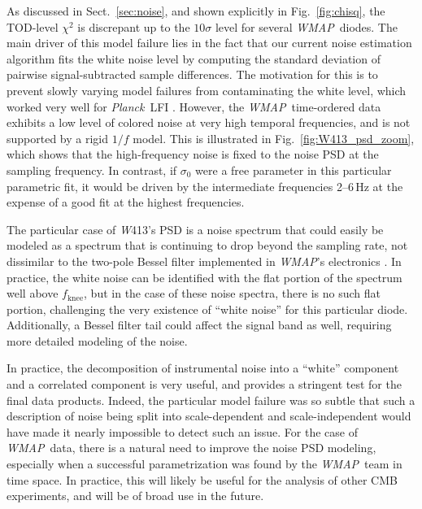 \documentclass[twocolumn]{../../common/aa}
\def\WMAP{\emph{WMAP}}
\def\Planck{\emph{Planck}}
\newcommand{\W}[0]{\textit W}
\begin{document}
As discussed in Sect.~\ref{sec:noise}, and shown explicitly in Fig.~\ref{fig:chisq}, the TOD-level $\chi^2$ is discrepant up to the $10\sigma$ level for several \WMAP\ diodes. The main driver of this model failure lies in the fact that our current noise estimation algorithm fits the white noise level by computing the standard deviation of pairwise signal-subtracted sample differences. The motivation for this is to prevent slowly varying model failures from contaminating the white level, which worked very well for \Planck\ LFI \citep{bp06}. However, the \WMAP\ time-ordered data exhibits a low level of colored noise at very high temporal frequencies, and is not supported by a rigid $1/f$ model. This is illustrated in Fig.~\ref{fig:W413_psd_zoom}, which shows that the high-frequency noise is fixed to the noise PSD at the sampling frequency. In contrast, if $\sigma_0$ were a free parameter in this particular parametric fit, it would be driven by the intermediate frequencies 2--6\,Hz at the expense of a good fit at the highest frequencies.



The particular case of \W413's PSD is a noise spectrum that could easily be modeled as a spectrum that is continuing to drop beyond the sampling rate, not dissimilar to the two-pole Bessel filter implemented in \WMAP's electronics \citep{jarosik2003:MAP}. In practice, the white noise can be identified with the flat portion of the spectrum well above $f_\mathrm{knee}$, but in the case of these noise spectra, there is no such flat portion, challenging the very existence of ``white noise'' for this particular diode. Additionally, a Bessel filter tail could affect the signal band as well, requiring more detailed modeling of the noise.

In practice, the decomposition of instrumental noise into a ``white'' component and a correlated component is very useful, and provides a stringent test for the final data products. Indeed, the particular model failure was so subtle that such a description of noise being split into scale-dependent and scale-independent would have made it nearly impossible to detect such an issue.
For the case of \WMAP\ data, there is a natural need to improve the noise PSD modeling, especially when a successful parametrization was found by the \WMAP\ team in time space. In practice, this will likely be useful for the analysis of other CMB experiments, and will be of broad use in the future.
\end{document}
